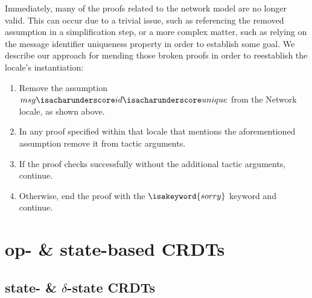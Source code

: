 Immediately, many of the proofs related to the network model are no longer
valid. This can occur due to a trivial issue, such as referencing the removed
assumption in a simplification step, or a more complex matter, such as relying
on the message identifier uniqueness property in order to establish some goal.
We describe our approach for mending those broken proofs in order to reestablish
the locale's instantiation:
\begin{enumerate}
  \item Remove the assumption
    $msg{\isacharunderscore}id{\isacharunderscore}unique$ from the Network
    locale, as shown above.
  \item In any proof specified within that locale that mentions the
    aforementioned assumption remove it from tactic arguments.
  \item If the proof checks successfully without the additional tactic
    arguments, continue.
  \item Otherwise, end the proof with the $\isakeyword{sorry}$ keyword and
    continue.
\end{enumerate}


\section{op- \& state-based CRDTs}
\label{sec:op-state-unify}

\subsection{state- \& $\delta$-state CRDTs}

